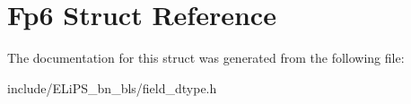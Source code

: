 \hypertarget{struct_fp6}{}\section{Fp6 Struct Reference}
\label{struct_fp6}


The documentation for this struct was generated from the following file\+:\begin{DoxyCompactItemize}
\item 
include/\+E\+Li\+P\+S\+\_\+bn\+\_\+bls/field\+\_\+dtype.\+h\end{DoxyCompactItemize}
